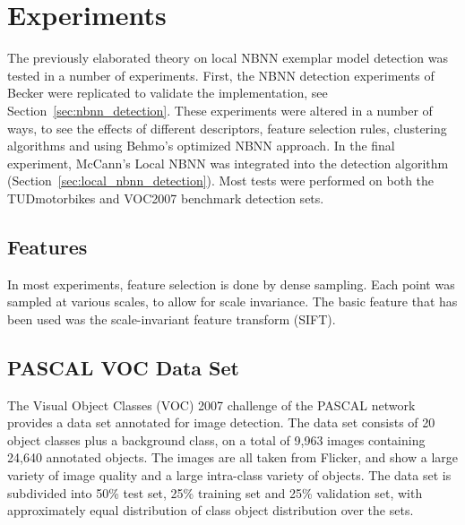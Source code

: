 \section{Experiments} %
\label{cha:experimental_setup}

The previously elaborated theory on local NBNN exemplar model detection was tested in a number of experiments. First, the NBNN detection experiments of Becker \cite{becker2012codebook} were replicated to validate the implementation, see Section~\ref{sec:nbnn_detection}. These experiments were altered in a number of ways, to see the effects of different descriptors, feature selection rules, clustering algorithms and using Behmo's optimized NBNN approach. In the final experiment, McCann's Local NBNN was integrated into the detection algorithm (Section~\ref{sec:local_nbnn_detection}). Most tests were performed on both the TUDmotorbikes and VOC2007 benchmark detection sets.

\subsection{Features} %
\label{sec:features}

In most experiments, feature selection is done by dense sampling. Each point was sampled at various scales, to allow for scale invariance. The basic feature that has been used was the scale-invariant feature transform (SIFT). \cite{lowe2004distinctive}



\subsection{PASCAL VOC Data Set} %

\label{sec:voc_data_set}
The Visual Object Classes (VOC) 2007 challenge of the PASCAL network \cite{pascal-voc-2007} provides a data set annotated for image detection. The data set consists of 20 object classes plus a background class, on a total of 9,963 images containing 24,640 annotated objects. The images are all taken from Flicker, and show a large variety of image quality and a large intra-class variety of objects. The data set is subdivided into 50\% test set, 25\% training set and 25\% validation set, with approximately equal distribution of class object distribution over the sets.

